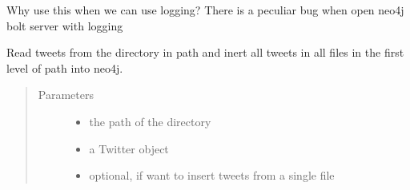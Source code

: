 \documentclass[letterpaper,10pt,english]{sphinxmanual}
\begin{document}

\begin{fulllineitems}
\label{\detokenize{neo4j_data_ingestion:ingest_neo4j_streaming.getFrameStartEndTime}}
\end{fulllineitems}


\begin{fulllineitems}
\label{\detokenize{neo4j_data_ingestion:ingest_neo4j_streaming.log}}
Why use this when we can use logging? There is a peculiar bug when open neo4j bolt server with logging

\end{fulllineitems}


\begin{fulllineitems}
\label{\detokenize{neo4j_data_ingestion:ingest_neo4j_streaming.read_tweets}}
Read tweets from the directory in path and inert all tweets in all files in the first level of path into
neo4j.
\begin{quote}\begin{description}
\item[{Parameters}] \leavevmode\begin{itemize}
\item {} 
 \textendash{} the path of the directory

\item {} 
 \textendash{} a Twitter object

\item {} 
 \textendash{} optional, if want to insert tweets from a single file

\end{itemize}

\end{description}\end{quote}

\end{fulllineitems}
\end{document}
